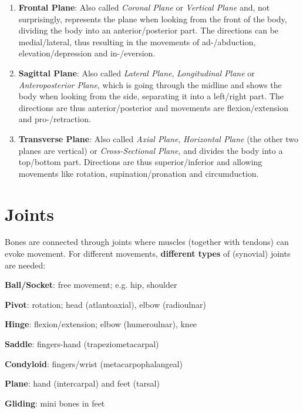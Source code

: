 \begin{enumerate}
    \item \textbf{Frontal Plane}: Also called \textit{Coronal Plane} or \textit{Vertical Plane} and, not surprisingly, represents the plane when looking from the front of the body, dividing the body into an anterior/posterior part.
    The directions can be medial/lateral, thus resulting in the movements of ad-/abduction, elevation/depression and in-/eversion.
    \item \textbf{Sagittal Plane}: Also called \textit{Lateral Plane}, \textit{Longitudinal Plane} or \textit{Anteroposterior Plane}, which is going through the midline and shows the body when looking from the side, separating it into a left/right part.
    The directions are thus anterior/posterior and movements are flexion/extension and pro-/retraction.
    \item \textbf{Transverse Plane}: Also called \textit{Axial Plane}, \textit{Horizontal Plane} (the other two planes are vertical) or \textit{Cross-Sectional Plane}, and divides the body into a top/bottom part.
    Directions are thus superior/inferior and allowing movements like rotation, supination/pronation and circumduction.
\end{enumerate}

\section{Joints}\label{sec:joints}

Bones are connected through joints where muscles (together with tendons) can evoke movement.
For different movements, \textbf{different types} of (synovial) joints are needed:

\begin{itemize*}
    \item \textbf{Ball/Socket}: free movement; e.g. hip, shoulder
    \item \textbf{Pivot}: rotation; head (atlantoaxial), elbow (radioulnar)
    \item \textbf{Hinge}: flexion/extension; elbow (humeroulnar), knee
    \item \textbf{Saddle}: fingers-hand (trapeziometacarpal)
    \item \textbf{Condyloid}: fingers/wrist (metacarpophalangeal)
    \item \textbf{Plane}: hand (intercarpal) and feet (tarsal)
    \item \textbf{Gliding}: mini bones in feet
\end{itemize*}
